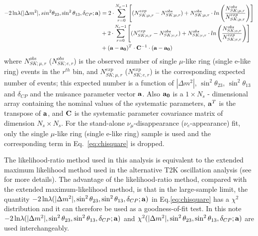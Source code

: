 \begin{equation}
\begin {split}
\displaystyle
 -2 \, \textrm{ln} \lambda (|\Delta m^{2}|, sin^{2}\theta_{23}, \sin^{2}\theta_{13}, \delta_{CP}; {\bf a}) &=
  2 \cdot \sum_{r=0}^{N_{\mu}-1}
   \left[
    (N^{exp}_{SK;\mu,r}-N^{obs}_{SK;\mu,r}) + 
     N^{obs}_{SK;\mu,r} \cdot ln\left(\frac{N^{obs}_{SK;\mu,r}}{N^{exp}_{SK;\mu,r}}\right)  
   \right]  \\
    \displaystyle
    &+ 2 \cdot \sum_{r=0}^{N_{e}-1}
    \left[
    (N^{exp}_{SK;e,r}-N^{obs}_{SK;e,r}) + 
     N^{obs}_{SK;e,r} \cdot ln\left(\frac{N^{obs}_{SK;e,r}}{N^{exp}_{SK;e,r}}\right)  
   \right]  \\
  &+  ({\bf a}-{\bf a_{0}})^{T} \cdot {\bf C}^{-1} \cdot ({\bf a}-{\bf a_{0}})
\label{eq:chisquare}
\end{split}
\end{equation}
where
$N^{obs}_{SK;\mu,r}$ ($N^{obs}_{SK;e,r}$) is the observed number of single $\mu$-like ring (single e-like ring) events in the $r^{th}$ bin, 
and $N^{exp}_{SK;\mu,r}$ ($N^{exp}_{SK;e,r}$)
is the corresponding expected number of events; this expected number is a function of 
$|\Delta m^{2}|$, $\sin^{2}\theta_{23}$, $\sin^{2}\theta_{13}$ and $\delta_{CP}$
and the nuisance parameter vector ${\bf a}$.
Also ${\bf a_{0}}$ is a $1 \times N_{s}$ - dimensional array containing the nominal values of
the systematic parameters, ${\bf a}^{T}$ is the transpose of ${\bf a}$,
and ${\bf C}$ is the systematic parameter covariance matrix of dimension $N_{s} \times N_{s}$.
For the stand-alone $\nu_{\mu}$-disappearance ($\nu_{e}$-appearance) fit, 
only the single $\mu$-like ring (single e-like ring) sample is used and the 
corresponding term in Eq.\ \ref{eq:chisquare} is dropped.

The likelihood-ratio method used in this analysis is equivalent to the extended maximum likelihood
method used in the alternative T2K oscillation analysis 
(see \cite{OurRun1DisappAnalysis,StatAnalysisCowan} for more details).
The advantage of the likelihood-ratio method, compared with the extended maximum-likelihood method, is that
in the large-sample limit, the quantity $-2 \, \textrm{ln} \lambda (|\Delta m^{2}|, \sin^{2}\theta_{23}, \sin^{2}\theta_{13}, \delta_{CP}; {\bf a})$
in Eq.\ref{eq:chisquare} has a $\chi^{2}$ distribution and it can therefore be used as a goodness-of-fit test.
In this note
$-2 \, \textrm{ln} \lambda (|\Delta m^{2}|, \sin^{2}\theta_{23}, \sin^{2}\theta_{13}, \delta_{CP}; {\bf a})$ and
$\chi^{2}(|\Delta m^{2}|, \sin^{2}\theta_{23}, \sin^{2}\theta_{13}, \delta_{CP}; {\bf a})$ are used interchangeably. 

